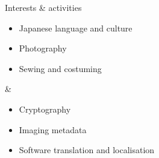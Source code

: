 \documentclass[a4paper,10pt]{article}
\begin{document}

\begin{interestsblock}{Interests \& activities}


\begin{itemize}[topsep=-2mm,itemsep=1mm,parsep=1mm]

\item Japanese language and culture
\item Photography
\item Sewing and costuming

\end{itemize}
&

\begin{itemize}[topsep=-2mm,itemsep=1mm,parsep=1mm]

\item Cryptography
\item Imaging metadata
\item Software translation and localisation

\end{itemize}


\end{interestsblock}
\end{document}
